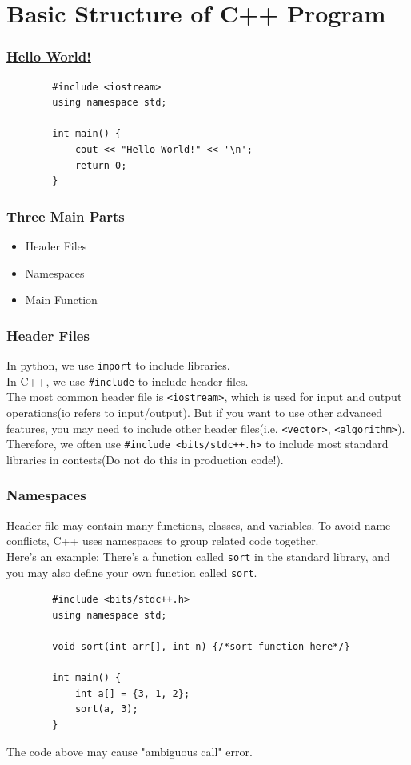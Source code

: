 \documentclass[xcolor=dvipsnames]{beamer}
\begin{document}
    \section{Basic Structure of C++ Program}

    \begin{frame}[fragile]
        \frametitle{\href{https://zh.wikipedia.org/zh-tw/Hello_Worldtext}{Hello World!}}
        \begin{verbatim}
        #include <iostream>
        using namespace std;

        int main() {
            cout << "Hello World!" << '\n';
            return 0;
        }
        \end{verbatim}
    \end{frame}

    \begin{frame}
        \frametitle{Three Main Parts}
        \begin{itemize}
            \item Header Files
            \item Namespaces
            \item Main Function
        \end{itemize}
    \end{frame}

    \begin{frame}
        \frametitle{Header Files}
        In python, we use \texttt{import} to include libraries.\\
        In C++, we use \texttt{\#include} to include header files.\\
        The most common header file is \texttt{<iostream>}, which is used for input and output operations(io refers to input/output). But if you want to use other advanced features, you may need to include other header files(i.e. \texttt{<vector>}, \texttt{<algorithm>}). Therefore, we often use \texttt{\#include <bits/stdc++.h>} to include most standard libraries in contests(Do not do this in production code!).

    \end{frame}

    \begin{frame}[fragile]
        \frametitle{Namespaces}
        Header file may contain many functions, classes, and variables. To avoid name conflicts, C++ uses namespaces to group related code together.\\
        Here's an example:
        There's a function called \texttt{sort} in the standard library, and you may also define your own function called \texttt{sort}.
        \begin{verbatim}
        #include <bits/stdc++.h>
        using namespace std;

        void sort(int arr[], int n) {/*sort function here*/}

        int main() {
            int a[] = {3, 1, 2};
            sort(a, 3);
        }            
        \end{verbatim}
        The code above may cause "ambiguous call" error.
    \end{frame}
\end{document}
